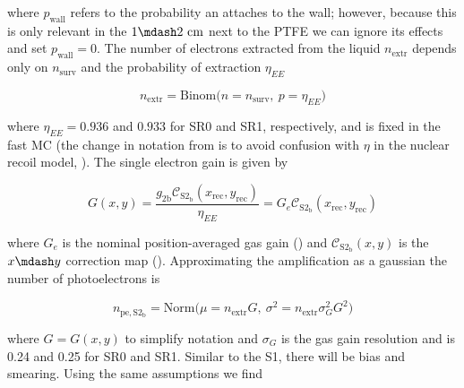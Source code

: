 \noindent where $p_{\mathrm{wall}}$
refers to the probability an \electron attaches to the wall; however, because this is only relevant in the $1 \mdash 2\ \mathrm{cm}$
next to the PTFE we can ignore its effects and set $p_{\mathrm{wall}} = 0$.  The number of electrons extracted from the liquid
$n_{\mathrm{extr}}$ depends only on $n_{\mathrm{surv}}$ and the probability of extraction $\eta_{EE}$

\vspace{-10pt}

\begin{equation}
n_{\mathrm{extr}} = \mathrm{Binom} \Big( n = n_{\mathrm{surv}},\ p = \eta_{EE} \Big)
\end{equation}

\noindent where $\eta_{EE} = 0.936$ and $0.933$ for SR0 and SR1, respectively, and is fixed in the fast MC (the change in notation from
 is to avoid confusion with $\eta$ in the nuclear recoil model,
).  The single electron gain is given by

\vspace{-5pt}

\begin{equation}
G (x, y) = \frac{g_{2\mathrm{b}} \mathcal{C}_{\mathrm{S2_b}}(x_{\mathrm{rec}}, y_{\mathrm{rec}})}{\eta_{EE}} =
G_e \mathcal{C}_{\mathrm{S2_b}}(x_{\mathrm{rec}}, y_{\mathrm{rec}})
\label{eq:er_nr_calibrations_parameter_determ_det_phys_gg}
\end{equation}

\noindent where $G_e$ is the nominal position-averaged gas gain () and
$\mathcal{C}_{\mathrm{S2_b}}(x, y)$ is the \stwob $x \mdash y$ correction map
().  Approximating the amplification as a gaussian the number of photoelectrons is

\vspace{-10pt}

\begin{equation}
n_{\mathrm{pe,S2_b}} =  \mathrm{Norm} \Big( \mu = n_{\mathrm{extr}} G,\
\sigma^2 = n_{\mathrm{extr}} \sigma_{G}^2 G^2 \Big)
\label{eq:er_nr_calibrations_parameter_determ_det_phys_s2_num_pe}
\end{equation}

\noindent where $G = G(x, y)$ to simplify notation and $\sigma_G$ is the gas gain resolution and is 0.24 and 0.25 for SR0 and
SR1.  Similar to the S1, there will be bias and smearing.  Using the same assumptions we find

